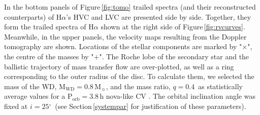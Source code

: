 \documentclass[fleqn,usenatbib]{mnras}
\def\msun{M$_{\odot}$}
\def\msun{M$_{\sun}$}
\def\grad{$^\circ$}
\begin{document}
In the bottom panels of Figure\,\ref{fig:tomo} trailed spectra (and their reconstructed counterparts) of
H$\alpha$'s  HVC and LVC are presented side by side. Together, they form 
the trailed spectra of H$\alpha$ shown at the right side of Figure\,\ref{fig:rvcurves}.  Meanwhile,  in the upper panels, the velocity maps
resulting from the Doppler tomography are shown.  Locations of the
stellar components are marked by "$\times$", the centre of the masses by "$+$". The Roche lobe of the secondary star and the
ballistic trajectory of mass transfer flow are over-plotted, as well as a ring corresponding to
the outer radius of the disc. To calculate them, we selected the mass of the WD, M$_{\mathrm{WD}}=0.8$\,\msun, and the mass
ratio,  $q=0.4$\  as statistically average values for a P$_{\mathrm {orb}}=3.8$\,h nova-like CV
\citep{2011ApJS..194...28K,2011A&A...536A..42Z}.
The orbital inclination angle was fixed at  $i=25$\grad\ (see Section\,\ref{systempar} for justification of these parameters). 
\end{document}
